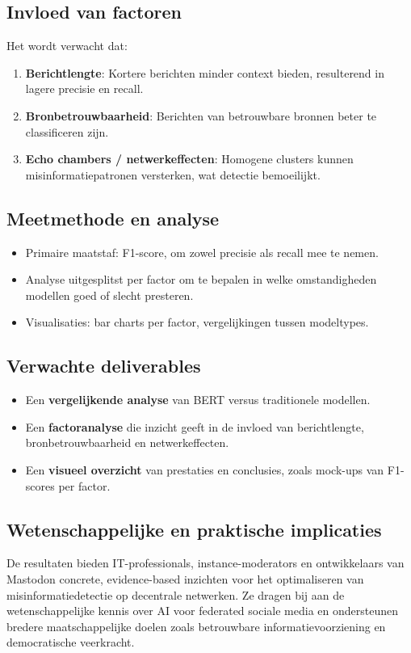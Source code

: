 \subsection{Invloed van factoren}
Het wordt verwacht dat:
\begin{enumerate}[leftmargin=*]
    \item \textbf{Berichtlengte}: Kortere berichten minder context bieden, resulterend in lagere precisie en recall.
    \item \textbf{Bronbetrouwbaarheid}: Berichten van betrouwbare bronnen beter te classificeren zijn.
    \item \textbf{Echo chambers / netwerkeffecten}: Homogene clusters kunnen misinformatiepatronen versterken, wat detectie bemoeilijkt.
\end{enumerate}

\subsection{Meetmethode en analyse}
\begin{itemize}
    \item Primaire maatstaf: F1-score, om zowel precisie als recall mee te nemen.
    \item Analyse uitgesplitst per factor om te bepalen in welke omstandigheden modellen goed of slecht presteren.
    \item Visualisaties: bar charts per factor, vergelijkingen tussen modeltypes.
\end{itemize}

\subsection{Verwachte deliverables}
\begin{itemize}
    \item Een \textbf{vergelijkende analyse} van BERT versus traditionele modellen.
    \item Een \textbf{factoranalyse} die inzicht geeft in de invloed van berichtlengte, bronbetrouwbaarheid en netwerkeffecten.
    \item Een \textbf{visueel overzicht} van prestaties en conclusies, zoals mock-ups van F1-scores per factor.
\end{itemize}

\subsection{Wetenschappelijke en praktische implicaties}
De resultaten bieden IT-professionals, instance-moderators en ontwikkelaars van Mastodon concrete, evidence-based inzichten voor het optimaliseren van misinformatiedetectie op decentrale netwerken.  
Ze dragen bij aan de wetenschappelijke kennis over AI voor federated sociale media en ondersteunen bredere maatschappelijke doelen zoals betrouwbare informatievoorziening en democratische veerkracht.

